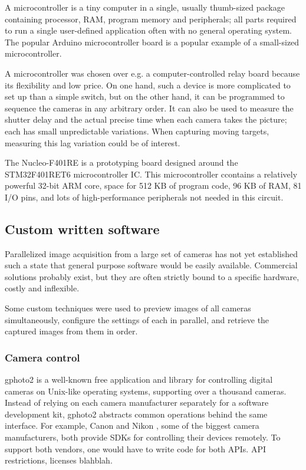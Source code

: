 A microcontroller is a tiny computer in a single, usually thumb-sized package containing processor, RAM, program memory and peripherals; all parts required to run a single user-defined application often with no general operating system.
The popular Arduino microcontroller board is a popular example of a small-sized microcontroller.

A microcontroller was chosen over e.g. a computer-controlled relay board because its flexibility and low price.
On one hand, such a device is more complicated to set up than a simple switch, but on the other hand, it can be programmed to sequence the cameras in any arbitrary order.
It can also be used to measure the shutter delay and the actual precise time when each camera takes the picture; each has small unpredictable variations.
When capturing moving targets, measuring this lag variation could be of interest.

The Nucleo-F401RE is a prototyping board designed around the STM32F401RET6 microcontroller IC.
This microcontroller ccontains a relatively powerful 32-bit ARM core, space for 512 KB of program code, 96 KB of RAM, 81 I/O pins, and lots of high-performance peripherals not needed in this circuit.


\subsection{Custom written software} %

Parallelized image acquisition from a large set of cameras has not yet established such a state that general purpose software would be easily available.
Commercial solutions probably exist, but they are often strictly bound to a specific hardware, costly and inflexible.

Some custom techniques were used to preview images of all cameras simultaneously, configure the settings of each in parallel, and retrieve the captured images from them in order.


\subsubsection{Camera control} %

gphoto2 \cite{gphoto2} is a well-known free application and library for controlling digital cameras on Unix-like operating systems, supporting over a thousand cameras.
Instead of relying on each camera manufacturer separately for a software development kit, gphoto2 abstracts common operations behind the same interface.
For example, Canon \cite{canonsdk} and Nikon \cite{nikonsdk}, some of the biggest camera manufacturers, both provide SDKs for controlling their devices remotely.
To support both vendors, one would have to write code for both APIs.
API restrictions, licenses blahblah.

